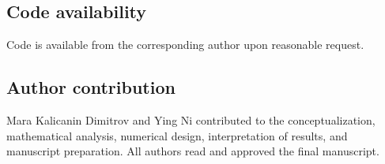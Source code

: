 \documentclass[pdflatex,sn-mathphys-num]{sn-jnl}
\theoremstyle{thmstyleone}%
\theoremstyle{thmstylethree}%
\theoremstyle{thmstyletwo}%
\begin{document}
\subsection*{Code availability}
Code is available from the corresponding author upon reasonable request.

\subsection*{Author contribution}
Mara Kalicanin Dimitrov and Ying Ni contributed to the conceptualization, mathematical analysis, numerical design, interpretation of results, and manuscript preparation. All authors read and approved the final manuscript.




\end{document}
